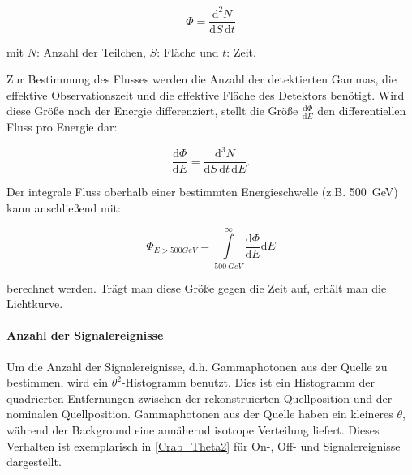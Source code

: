 \begin{equation}
 \Phi=\frac{\mathrm{d}^2 N}{\mathrm{d}S \, \mathrm{d}t} 
\end{equation}

 \begin{center}
  \small{mit $N$: Anzahl der Teilchen, $S$: Fläche und $t$: Zeit.}
 \end{center}
 
Zur Bestimmung des Flusses werden die Anzahl der detektierten Gammas, die effektive Observationszeit und die effektive Fläche des Detektors benötigt.
Wird diese Größe nach der Energie differenziert, stellt die Größe $\frac{\mathrm{d}\Phi}{\mathrm{d}E}$ den differentiellen Fluss pro Energie dar:

\begin{equation}
 \frac{\mathrm{d}\Phi}{\mathrm{d}E}=\frac{\mathrm{d}^3N}{\mathrm{d}S \, \mathrm{d}t \, \mathrm{d}E}.
\end{equation}

Der integrale Fluss oberhalb einer bestimmten Energieschwelle (z.B. \SI{500}{GeV}) kann anschließend mit:

\begin{equation}
 \Phi_{E>500GeV}=\int\limits_{\SI{500}{GeV}}^{\infty}\frac{\mathrm{d}\Phi}{\mathrm{d}E}\mathrm{d}E
\end{equation}

berechnet werden.
Trägt man diese Größe gegen die Zeit auf, erhält man die Lichtkurve.\cite{Lichtkurve}


\paragraph{Anzahl der Signalereignisse}
Um die Anzahl der Signalereignisse, d.h. Gammaphotonen aus der Quelle zu bestimmen, wird ein $\theta^2$-Histogramm benutzt.
Dies ist ein Histogramm der quadrierten Entfernungen zwischen der rekonstruierten Quellposition und der nominalen Quellposition.
Gammaphotonen aus der Quelle haben ein kleineres $\theta$, während der Background eine annähernd isotrope Verteilung liefert. 
Dieses Verhalten ist exemplarisch in \autoref{Crab_Theta2} für On-, Off- und Signalereignisse dargestellt.

